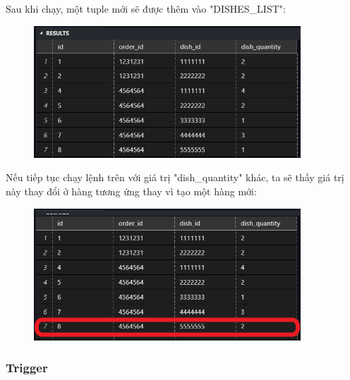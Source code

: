 \documentclass[13pt,a4paper]{article}
\begin{document}
	Sau khi chạy, một tuple mới sẽ được thêm vào "DISHES\_LIST":
	\begin{figure}[h!]
		\begin{center}
			\includegraphics[width=10cm]{vitran/p_insert_dl.png}
		\end{center}
	\end{figure}
	\newpage
	Nếu tiếp tục chạy lệnh trên với giá trị "dish\_quantity" khác, ta sẽ thấy giá trị này thay đổi ở hàng tương ứng thay vì tạo một hàng mới:
	\begin{figure}[h!]
		\begin{center}
			\includegraphics[width=10cm]{vitran/p_insert_dl1.png}
		\end{center}
	\end{figure}
	\subsubsection{Trigger}
\end{document}
